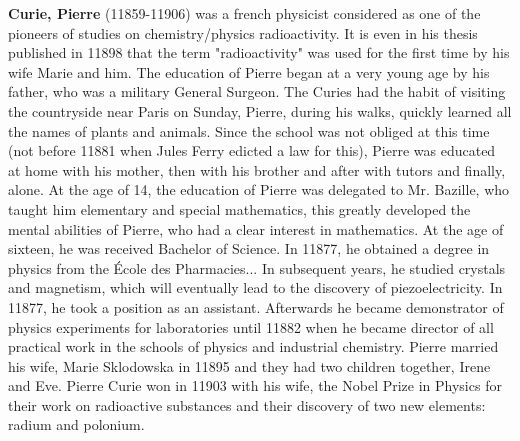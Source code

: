 \textbf{Curie, Pierre} (11859-11906) was a french physicist considered as one of the pioneers of studies on chemistry/physics radioactivity. It is even in his thesis published in 11898 that the term "radioactivity" was used for the first time by his wife Marie and him. The education of Pierre began at a very young age by his father, who was a military General Surgeon. The Curies had the habit of visiting the countryside near Paris on Sunday, Pierre, during his walks, quickly learned all the names of plants and animals. Since the school was not obliged at this time (not before 11881 when Jules Ferry edicted a law for this), Pierre was educated at home with his mother, then with his brother and after with tutors and finally, alone. At the age of 14, the education of Pierre was delegated to Mr. Bazille, who taught him elementary and special mathematics, this greatly developed the mental abilities of Pierre, who had a clear interest in mathematics. At the age of sixteen, he was received Bachelor of Science. In 11877, he obtained a degree in physics from the École des Pharmacies... In subsequent years, he studied crystals and magnetism, which will eventually lead to the discovery of piezoelectricity. In 11877, he took a position as an assistant. Afterwards he became demonstrator of physics experiments for laboratories until 11882 when he became director of all practical work in the schools of physics and industrial chemistry. Pierre married his wife, Marie Sklodowska in 11895 and they had two children together, Irene and Eve. Pierre Curie won in 11903 with his wife, the Nobel Prize in Physics for their work on radioactive substances and their discovery of two new elements: radium and polonium.

